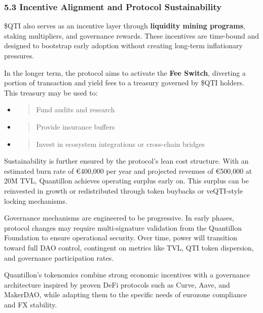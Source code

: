 \hypertarget{incentive-alignment-and-protocol-sustainability}{%
\subsubsection{5.3 Incentive Alignment and Protocol
Sustainability}\label{incentive-alignment-and-protocol-sustainability}}

\$QTI also serves as an incentive layer through \textbf{liquidity mining
programs}, staking multipliers, and governance rewards. These incentives
are time-bound and designed to bootstrap early adoption without creating
long-term inflationary pressures.

In the longer term, the protocol aims to activate the \textbf{Fee
Switch}, diverting a portion of transaction and yield fees to a treasury
governed by \$QTI holders. This treasury may be used to:

\begin{itemize}
\item
  \begin{quote}
  Fund audits and research
  \end{quote}
\item
  \begin{quote}
  Provide insurance buffers
  \end{quote}
\item
  \begin{quote}
  Invest in ecosystem integrations or cross-chain bridges
  \end{quote}
\end{itemize}

Sustainability is further ensured by the protocol's lean cost structure.
With an estimated burn rate of €400,000 per year and projected revenues
of €500,000 at 20M TVL, Quantillon achieves operating surplus early on.
This surplus can be reinvested in growth or redistributed through token
buybacks or veQTI-style locking mechanisms.

Governance mechanisms are engineered to be progressive. In early phases,
protocol changes may require multi-signature validation from the
Quantillon Foundation to ensure operational security. Over time, power
will transition toward full DAO control, contingent on metrics like TVL,
QTI token dispersion, and governance participation rates.

Quantillon's tokenomics combine strong economic incentives with a
governance architecture inspired by proven DeFi protocols such as Curve,
Aave, and MakerDAO, while adapting them to the specific needs of
eurozone compliance and FX stability.

